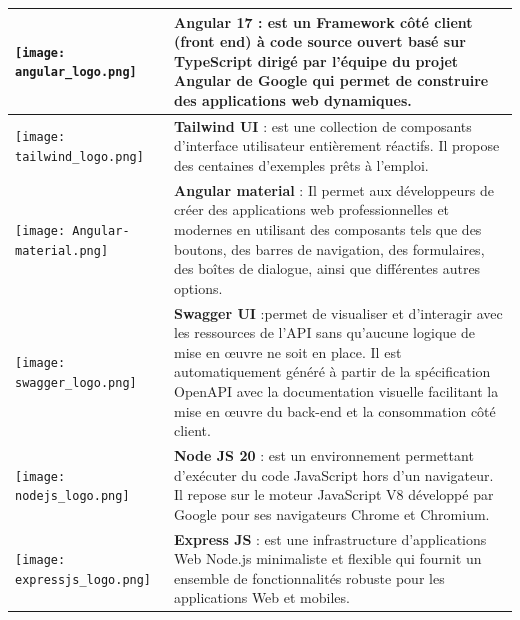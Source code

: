 \begin{longtable}[c]{
    |p{}
    |p{}|
    }
    \vspace{0.5 mm}
    \texttt{[image: angular\_logo.png]}   &\textbf{ Angular 17}   : est un Framework côté client (front end) à code source ouvert basé sur TypeScript dirigé par l’équipe du projet Angular de Google qui permet de construire des applications web dynamiques.\cite[]{angular}                                                                                                   \\
    \hline
    \vspace{0.5 mm}
    \texttt{[image: tailwind\_logo.png]}  & \textbf{ Tailwind UI} : est une collection de composants d'interface utilisateur entièrement réactifs. Il propose des centaines d'exemples prêts à l'emploi.   \cite[]{tailwind}                                                                                                                                                  \\
    \hline
    \vspace{0.5 mm}
    \texttt{[image: Angular-material.png]}  & \textbf{ Angular material } :     Il permet aux développeurs de créer des applications web professionnelles et modernes en utilisant des composants tels que des boutons, des barres de navigation, des formulaires, des boîtes de dialogue, ainsi que différentes autres options. \cite[]{angularMaterial}   \\
    \hline
    \vspace{0.5 mm}
    \texttt{[image: swagger\_logo.png]}   & \textbf{Swagger UI }:permet de visualiser et d'interagir avec les ressources de l'API sans qu'aucune logique de mise en œuvre ne soit en place. Il est automatiquement généré à partir de la spécification OpenAPI avec la documentation visuelle facilitant la mise en œuvre du back-end et la consommation côté client. \cite[]{OutilSwagger}\\
    \hline
    \vspace{0.5 mm}
    \texttt{[image: nodejs\_logo.png]}    & \textbf{Node JS 20} : est un environnement permettant d'exécuter du code JavaScript hors d'un navigateur. Il repose sur le moteur JavaScript V8 développé par Google pour ses navigateurs Chrome et Chromium.   \cite[]{nodeJS}                                                                                                         \\
    \hline
    \vspace{0.5 mm}
    \texttt{[image: expressjs\_logo.png]} & \textbf{Express JS }: est une infrastructure d'applications Web Node.js minimaliste et flexible qui fournit un ensemble de fonctionnalités robuste pour les applications Web et mobiles.  \cite[]{ExpressJS}                                                                                                                               \\

\end{longtable}
